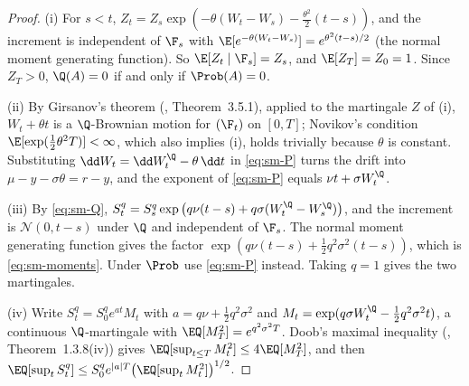 \begin{proof}
(i) For $s<t$, $Z_t=Z_s\exp(-\theta(W_t-W_s)-\frac{\theta^2}2(t-s))$, and the increment is
independent of $\F_s$ with $\E[e^{-\theta(W_t-W_s)}]=e^{\theta^2(t-s)/2}$ (the normal moment
generating function). So $\E[Z_t\mid\F_s]=Z_s$, and $\E[Z_T]=Z_0=1$. Since $Z_T>0$,
$\Q(A)=0$ if and only if $\Prob(A)=0$.

(ii) By Girsanov's theorem (\textcite{karatzas-shreve}, Theorem~3.5.1), applied to the
martingale $Z$ of (i), $W_t+\theta t$ is a $\Q$-Brownian motion for $(\F_t)$ on $[0,T]$; Novikov's
condition $\E[\exp(\frac12\theta^2T)]<\infty$, which also implies (i), holds trivially because
$\theta$ is constant. Substituting $\dd W_t=\dd W^\Q_t-\theta\,\dd t$ in \eqref{eq:sm-P} turns the
drift into $\mu-y-\sigma\theta=r-y$, and the exponent of \eqref{eq:sm-P} equals
$\nu t+\sigma W^\Q_t$.

(iii) By \eqref{eq:sm-Q}, $S_t^q=S_s^q\exp\big(q\nu(t-s)+q\sigma(W^\Q_t-W^\Q_s)\big)$, and the
increment is $\mathcal N(0,t-s)$ under $\Q$ and independent of $\F_s$. The normal moment
generating function gives the factor $\exp(q\nu(t-s)+\frac12q^2\sigma^2(t-s))$, which is
\eqref{eq:sm-moments}. Under $\Prob$ use \eqref{eq:sm-P} instead. Taking $q=1$ gives the two
martingales.

(iv) Write $S_t^q=S_0^qe^{at}M_t$ with $a=q\nu+\frac12q^2\sigma^2$ and
$M_t=\exp(q\sigma W^\Q_t-\frac12q^2\sigma^2t)$, a continuous $\Q$-martingale with
$\EQ[M_T^2]=e^{q^2\sigma^2T}$. Doob's maximal inequality (\textcite{karatzas-shreve},
Theorem~1.3.8(iv)) gives $\EQ[\sup_{t\le T}M_t^2]\le4\EQ[M_T^2]$, and then
$\EQ[\sup_tS_t^q]\le S_0^qe^{|a|T}\big(\EQ[\sup_tM_t^2]\big)^{1/2}$.
\end{proof}

